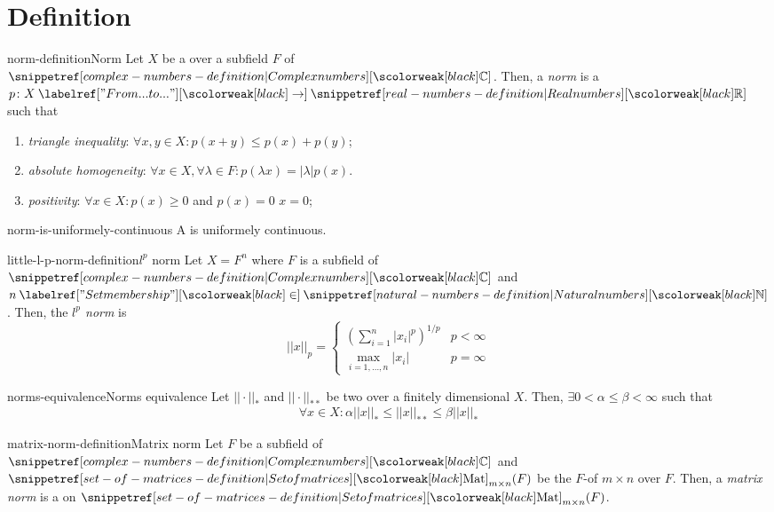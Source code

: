 \documentclass[preview]{standalone}
\begin{document}
\genpage

\section{Definition}

\begin{snippetdefinition}{norm-definition}{Norm}
    Let \(X\) be a \vectorspace over a subfield \(F\) of \(\complexnumbers\).
    Then, a \emph{norm} is a \function \(p\colon X \fromto \realnumbers\) such that
    \begin{enumerate}
        \item \emph{triangle inequality}: \(\forall x,y\in X\colon p(x+y) \leq p(x) + p(y)\);
        \item \emph{absolute homogeneity}: \(\forall x\in X,\forall \lambda\in F\colon p(\lambda x) = |\lambda|p(x)\).
        \item \emph{positivity}: \(\forall x\in X\colon p(x) \geq 0\) and \(p(x) = 0\) \ifandonlyif \(x = 0\);
    \end{enumerate}
\end{snippetdefinition}

\begin{snippetproposition}{norm-is-uniformely-continuous}{}
    A \norm is uniformely continuous.
\end{snippetproposition}

\begin{snippetdefinition}{little-l-p-norm-definition}{\(l^p\) norm}
    Let \(X = F^n\) where \(F\) is a subfield of \(\complexnumbers\) and \(n\in\naturalnumbers\).
    Then, the \emph{\(l^p\) norm} is \norm
    \[
        ||x||_p = \begin{cases}
            \left( \sum_{i=1}^n |x_i|^p \right)^{1/p} & p < \infty\\
            \max_{i=1,\ldots,n} |x_i| & p = \infty
        \end{cases}
    \]
\end{snippetdefinition}

\begin{snippetproposition}{norms-equivalence}{Norms equivalence}
    Let \(||\cdot||_*\) and \(||\cdot||_{**}\) be two \norm[norms] over a finitely dimensional \(X\). Then,
    \(\exists 0 < \alpha \leq \beta < \infty\) such that
    \[
        \forall x\in X\colon \alpha ||x||_* \leq ||x||_{**} \leq \beta ||x||_*
    \]
\end{snippetproposition}

\begin{snippetdefinition}{matrix-norm-definition}{Matrix norm}
    Let \(F\) be a subfield of \(\complexnumbers\) and \(\matrices_{m\times n}(F)\)
    be the \(F\)-\vectorspace of \(m\times n\) \matrix[matrices] over \(F\).
    Then, a \emph{matrix norm} is a \norm on \(\matrices_{m\times n}(F)\).
\end{snippetdefinition}
\end{document}
